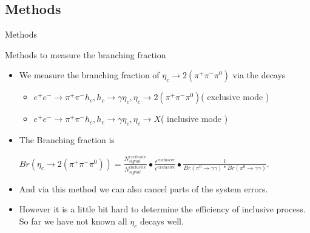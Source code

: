 \documentclass{beamer}
\begin{document}
\subsection{Methods}
\begin{frame}{Methods}
  \begin{block}{Methods to measure the branching fraction}
    \begin{itemize}
      \item We measure the branching fraction of $\eta_c\to 2(\pi^+\pi^-\pi^0)$ via the decays
        \begin{itemize}
          \item $e^+e^-\to \pi^+ \pi^- h_c, h_c\to \gamma\eta_c, \eta_c\to 2(\pi^+\pi^-\pi^0)$( exclusive mode )
          \item $e^+e^-\to \pi^+ \pi^- h_c, h_c\to \gamma\eta_c, \eta_c\to X$( inclusive mode )
        \end{itemize}
      \item The Branching fraction is\\
        \begin{center}
          $Br(\eta_c\to 2(\pi^+\pi^-\pi^0)) = \frac{N^{exclusive}_{signal}}{N^{inclusive}_{signal}}\bullet\frac{\epsilon^{inclusive}}{\epsilon^{exclusive}}\bullet\frac{1}{Br(\pi^0\to\gamma\gamma)*Br(\pi^0\to\gamma\gamma)}$.
        \end{center}
    \end{itemize}
  \end{block}
  \begin{block}{}
    \begin{itemize}
      \item And via this method we can also cancel parts of the system errors.
      \item However it is a little bit hard to determine the efficiency of inclusive process. So far we have not known all $\eta_c$ decays well.
    \end{itemize}
  \end{block}
\end{frame}
\end{document}
